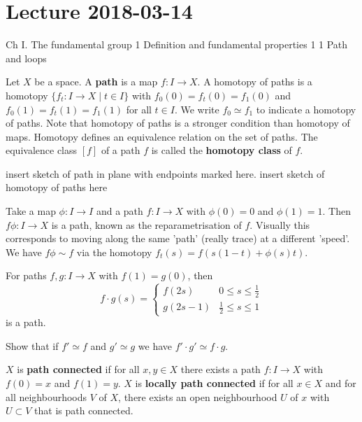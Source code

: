 \section{Lecture 2018-03-14}

Ch I. The fundamental group
1 Definition and fundamental properties
1 1 Path and loops

\begin{defn}
	Let $X$ be a space.
	A \textbf{path} is a map $f:I \to X$.
	A homotopy of paths is a homotopy $\{f_t: I \to X \mid t \in I\}$ with $f_0(0)=f_t(0)=f_1(0)$ and $f_0(1)=f_t(1)=f_1(1)$ for all $t \in I$.
	We write $f_0 \simeq f_1$ to indicate a homotopy of paths.
	Note that homotopy of paths is a stronger condition than homotopy of maps.
	Homotopy defines an equivalence relation on the set of paths.
	The equivalence class $[f]$ of a path $f$ is called the \textbf{homotopy class} of $f$.

	insert sketch of path in plane with endpoints marked here.
	insert sketch of homotopy of paths here
\end{defn}

\begin{exam}
	Take a map $\phi: I \to I$ and a path $f: I \to X$ with $\phi(0)=0$ and $\phi(1)=1$.
	Then $f\phi: I \to X$ is a path, known as the reparametrisation of $f$.
	Visually this corresponds to moving along the same 'path' (really trace) at a different 'speed'.
	We have $f\phi \sim f$ via the homotopy $f_t(s) = f(s(1-t)+\phi(s)t)$.
\end{exam}

\begin{defn}
	For paths $f,g: I \to X$ with $f(1)=g(0)$, then
	\[
	f \cdot g (s) =
	\begin{cases}
		f(2s) & 0 \leq s \leq \frac 12 \\
		g(2s-1) & \frac 12 \leq s \leq 1
	\end{cases}
	\]
	is a path.
\end{defn}

\begin{exer}
	Show that if $f' \simeq f$ and $g' \simeq g$ we have $f' \cdot g' \simeq f \cdot g$.
\end{exer}

\begin{defn}
	\begin{enum}
		\io $X$ is \textbf{path connected} if for all $x,y \in X$ there exists a path $f: I \to X$ with $f(0)=x$ and $f(1)=y$.
		\io $X$ is \textbf{locally path connected} if for all $x \in X$ and for all neighbourhoods $V$ of $X$, there exists an open neighbourhood $U$ of $x$ with $U \subset V$ that is path connected.
	\end{enum}
\end{defn}

